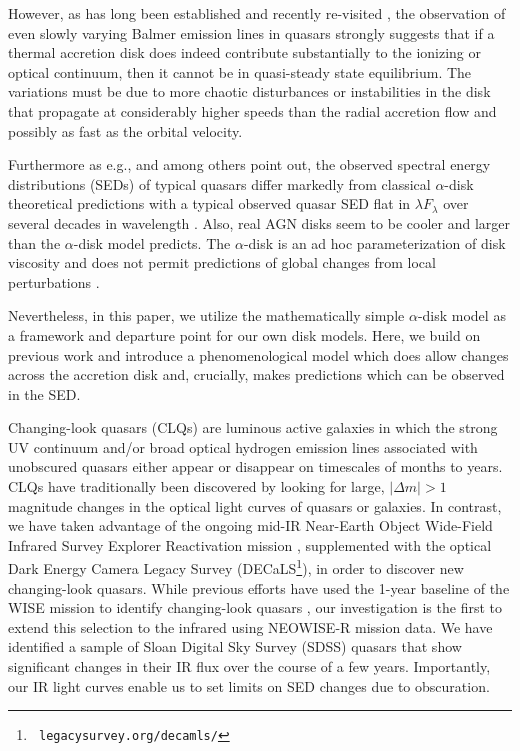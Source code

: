 \documentclass[a4paper,fleqn,usenatbib]{mnras}
\begin{document}
However, as has long been established \citep[e.g., ][]{Alloin1985} and
recently re-visited \citep[e.g., ][]{LaMassa2015, Runnoe2016,
MacLeod2016, Ruan2016, Rumbaugh2017, Yang2017, Lawrence2018}, the
observation of even slowly varying Balmer emission lines in quasars
strongly suggests that if a thermal accretion disk does indeed
contribute substantially to the ionizing or optical continuum, then it
cannot be in quasi-steady state equilibrium. The variations must be
due to more chaotic disturbances or instabilities in the disk that
propagate at considerably higher speeds than the radial accretion flow
and possibly as fast as the orbital velocity.

Furthermore as e.g., \citet{Koratkar_Blaes1999} and
\citet{Sirko_Goodman2003} among others point out, the observed
spectral energy distributions (SEDs) of typical quasars differ
markedly from classical $\alpha$-disk theoretical predictions
\citep[][]{SS73, Pringle1981} with a typical observed quasar SED flat
in $\lambda F_{\lambda}$ over several decades in wavelength
\citep{Elvis1994, Richards2006b}. Also, real AGN disks seem to be
cooler \citep[e.g., ][]{Lawrence2012} and larger
\citep[e.g.,][]{Pooley2007, Morgan2010, Morgan2012, Mosquera2011} than
the $\alpha$-disk model predicts. The $\alpha$-disk is an ad hoc
parameterization of disk viscosity and does not permit predictions of
global changes from local perturbations \citep{King2012}.

Nevertheless, in this paper, we utilize the mathematically simple
$\alpha$-disk model as a framework and departure point for our own
disk models. Here, we build on previous work \citep{Sirko_Goodman2003,
Zimmerman2005, Hameury2009} and introduce a phenomenological model
which does allow changes across the accretion disk and, crucially,
makes predictions which can be observed in the SED.

Changing-look quasars (CLQs) are luminous active galaxies in which the
strong UV continuum and/or broad optical hydrogen emission lines
associated with unobscured quasars either appear or disappear on
timescales of months to years. CLQs have traditionally been discovered
by looking for large, $| \Delta m | >1$ magnitude changes in the
optical light curves of quasars or galaxies. In contrast, we have
taken advantage of the ongoing mid-IR Near-Earth Object Wide-Field
Infrared Survey Explorer Reactivation mission \citep[NEOWISE-R;
][]{Mainzer2014, Meisner2017a, Meisner2017b}, supplemented with the
optical Dark Energy Camera Legacy Survey (DECaLS\footnote{{\tt
legacysurvey.org/decamls/}}), in order to discover new changing-look
quasars.  While previous efforts have used the 1-year baseline of the
WISE mission to identify changing-look quasars
\citep[e.g.,][]{Assef2018, Stern2018}, our investigation is the first
to extend this selection to the infrared using NEOWISE-R mission
data. We have identified a sample of Sloan Digital Sky Survey (SDSS)
quasars that show significant changes in their IR flux over the course
of a few years. Importantly, our IR light curves enable us to set
limits on SED changes due to obscuration.
\end{document}
